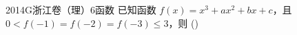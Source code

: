 
\begin{problem}{2014}{G}{浙江卷（理）}{6}{函数}
已知函数 $ f(x)=x^3+ax^2+bx+c $，且 $ 0<f(-1)=f(-2)=f(-3)\leqslant 3 $，则 (\hspace{1cm})
\begin{choices}
\end{choices}
\end{problem}

\begin{answer}

\end{answer}

\begin{solutions}

\end{solutions}